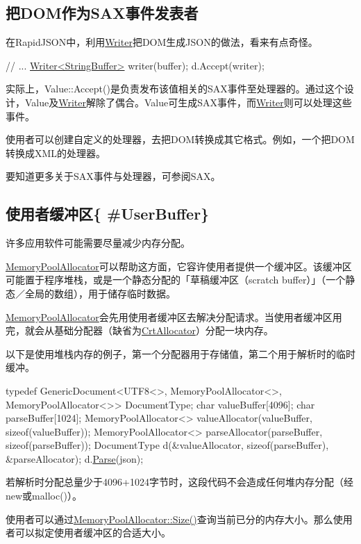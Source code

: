 \subsection*{把\+D\+O\+M作为\+S\+A\+X事件发表者}

在\+Rapid\+J\+S\+O\+N中，利用{\ttfamily \hyperlink{class_writer}{Writer}}把\+D\+O\+M生成\+J\+S\+O\+N的做法，看来有点奇怪。


\begin{DoxyCode}
\textcolor{comment}{// ...}
\hyperlink{class_writer}{Writer<StringBuffer>} writer(buffer);
d.Accept(writer);
\end{DoxyCode}


实际上，{\ttfamily Value\+::\+Accept()}是负责发布该值相关的\+S\+A\+X事件至处理器的。通过这个设计，{\ttfamily Value}及{\ttfamily \hyperlink{class_writer}{Writer}}解除了偶合。{\ttfamily Value}可生成\+S\+A\+X事件，而{\ttfamily \hyperlink{class_writer}{Writer}}则可以处理这些事件。

使用者可以创建自定义的处理器，去把\+D\+O\+M转换成其它格式。例如，一个把\+D\+O\+M转换成\+X\+M\+L的处理器。

要知道更多关于\+S\+A\+X事件与处理器，可参阅S\+AX。

\subsection*{使用者缓冲区\{ \#\+User\+Buffer\}}

许多应用软件可能需要尽量减少内存分配。

{\ttfamily \hyperlink{class_memory_pool_allocator}{Memory\+Pool\+Allocator}}可以帮助这方面，它容许使用者提供一个缓冲区。该缓冲区可能置于程序堆栈，或是一个静态分配的「草稿缓冲区（scratch buffer）」（一个静态／全局的数组），用于储存临时数据。

{\ttfamily \hyperlink{class_memory_pool_allocator}{Memory\+Pool\+Allocator}}会先用使用者缓冲区去解决分配请求。当使用者缓冲区用完，就会从基础分配器（缺省为{\ttfamily \hyperlink{class_crt_allocator}{Crt\+Allocator}}）分配一块内存。

以下是使用堆栈内存的例子，第一个分配器用于存储值，第二个用于解析时的临时缓冲。


\begin{DoxyCode}
\textcolor{keyword}{typedef} GenericDocument<UTF8<>, MemoryPoolAllocator<>, MemoryPoolAllocator<>> DocumentType;
\textcolor{keywordtype}{char} valueBuffer[4096];
\textcolor{keywordtype}{char} parseBuffer[1024];
MemoryPoolAllocator<> valueAllocator(valueBuffer, \textcolor{keyword}{sizeof}(valueBuffer));
MemoryPoolAllocator<> parseAllocator(parseBuffer, \textcolor{keyword}{sizeof}(parseBuffer));
DocumentType d(&valueAllocator, \textcolor{keyword}{sizeof}(parseBuffer), &parseAllocator);
d.\hyperlink{class_generic_document_aebd4e7fddd80c1e1174837aee6d2159b}{Parse}(json);
\end{DoxyCode}


若解析时分配总量少于4096+1024字节时，这段代码不会造成任何堆内存分配（经{\ttfamily new}或{\ttfamily malloc()}）。

使用者可以通过{\ttfamily \hyperlink{class_memory_pool_allocator_a2ccb6c068b8b35dbc3680dc5563af2f4}{Memory\+Pool\+Allocator\+::\+Size()}}查询当前已分的内存大小。那么使用者可以拟定使用者缓冲区的合适大小。 